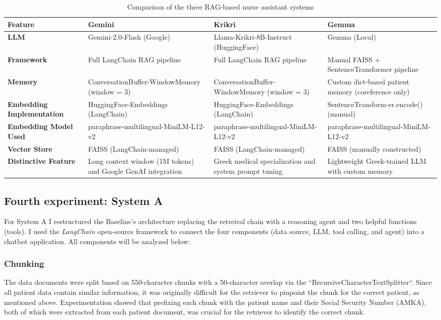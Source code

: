 \begin{table}[H]
\centering
\renewcommand{\arraystretch}{1.2} 
\large %
\begin{tabular}{|p{2.5cm}|p{4cm}|p{4cm}|p{4cm}|}
\hline
\textbf{Feature} & \textbf{Gemini} & \textbf{Krikri} & \textbf{Gemma} \\
\hline
\textbf{LLM} &
Gemini-2.0-Flash (Google) &
Llama-Krikri-8B-Instruct (HuggingFace) &
Gemma (Local) \\
\hline
\textbf{Framework} &
Full LangChain RAG pipeline &
Full LangChain RAG pipeline &
Manual FAISS + SentenceTransformer pipeline \\
\hline
\textbf{Memory} &
ConversationBuffer-WindowMemory (window = 3) &
ConversationBuffer-WindowMemory (window = 3) &
Custom dict-based patient memory (coreference only) \\
\hline
\textbf{Embedding Implementation} &
HuggingFace-Embeddings (LangChain) &
HuggingFace-Embeddings (LangChain) &
SentenceTransform-er.encode() (manual) \\
\hline
\textbf{Embedding Model Used} &
paraphrase-multilingual-MiniLM-L12-v2 &
paraphrase-multilingual-MiniLM-L12-v2 &
paraphrase-multilingual-MiniLM-L12-v2 \\
\hline
\textbf{Vector Store} &
FAISS (LangChain-managed) &
FAISS (LangChain-managed) &
FAISS (manually constructed) \\
\hline
\textbf{Distinctive Feature} &
Long context window (1M tokens) and Google GenAI integration &
Greek medical specialization and system prompt tuning &
Lightweight Greek-trained LLM with custom memory \\
\hline
\end{tabular}
\caption{Comparison of the three RAG-based nurse assistant systems}
\normalsize
\end{table}


\subsection{Fourth experiment: System A}

For System A I restructured the Baseline's architecture replacing the retreival chain with a reasoning agent and two helpful functions (tools). I used the \textit{LangChain} open-source framework to connect the four components (data source, LLM, tool calling, and agent) into a chatbot application. All components will be analyzed below.

\subsubsection{Chunking}
The data documents were split based on 550-character chunks with a 50-character overlap via the ``RecursiveCharacterTextSplitter``. Since all patient data contain similar information, it was originally difficult for the retriever to pinpoint the chunk for the correct patient, as mentioned above. Experimentation showed that prefixing each chunk with the patient name and their Social Security Number (AMKA), both of which were extracted from each patient document, was crucial for the retriever to identify the correct chunk.

